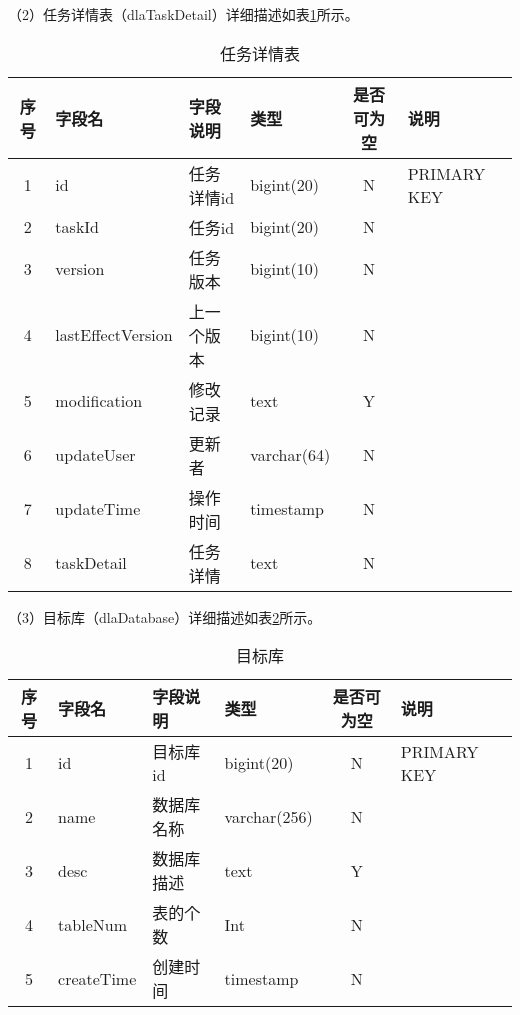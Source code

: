 （2）任务详情表（dlaTaskDetail）详细描述如表\ref{tab:任务详情表}所示。

\begin{table}[H]
  \centering
  \caption{任务详情表}
  \label{tab:任务详情表}
  \begin{tabular}{clllcl}
    \toprule
    序号  & 字段名              & 字段说明     & 类型           & 是否可为空   & 说明  \\
    \midrule
    1    & id                 & 任务详情id   & bigint(20)     & N          & PRIMARY KEY    \\
    2    & taskId             & 任务id      & bigint(20)     & N          &    \\
    3    & version            & 任务版本     & bigint(10)     & N          &   \\
    4    & lastEffectVersion  & 上一个版本   & bigint(10)     & N          &   \\
    5    & modification       & 修改记录     & text           & Y          &   \\
    6    & updateUser         & 更新者       & varchar(64)   & N          &    \\
    7    & updateTime         & 操作时间     & timestamp      & N          &   \\
    8    & taskDetail         & 任务详情     & text           & N          &   \\
    \bottomrule
  \end{tabular}
\end{table}

（3）目标库（dlaDatabase）详细描述如表\ref{tab:目标库}所示。

\begin{table}[H]
  \centering
  \caption{目标库}
  \label{tab:目标库}
  \begin{tabular}{clllcl}
    \toprule
    序号  & 字段名              & 字段说明     & 类型           & 是否可为空   & 说明  \\
    \midrule
    1    & id                 & 目标库id     & bigint(20)    & N          & PRIMARY KEY    \\
    2    & name               & 数据库名称    & varchar(256)  & N          &    \\
    3    & desc               & 数据库描述    & text          & Y          &   \\
    4    & tableNum           & 表的个数      & Int           & N          &   \\
    5    & createTime         & 创建时间      & timestamp     & N          &   \\
    \bottomrule
  \end{tabular}
\end{table}

